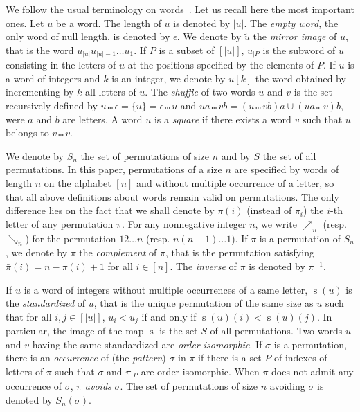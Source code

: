 \documentclass[a4paper]{llncs}
\DeclareMathOperator{\STD}{\mathrm{s}}
\begin{document}
We follow the usual terminology on words~\cite{ChoffrutKarhumaki1997}.
Let us recall here the most important ones. Let $u$ be a word. The
length of $u$ is denoted by $|u|$. The {\em empty word}, the only word
of null length, is denoted by $\epsilon$. We denote by $\widetilde{u}$
the {\em mirror image} of $u$, that is the word
$u_{|u|} u_{|u| - 1} \dots u_1$. If $P$ is a subset of $[|u|]$, $u_{|P}$
is the subword of $u$ consisting in the letters of $u$ at the positions
specified by the elements of $P$. If $u$ is a word of integers and $k$
is an integer, we denote by $u[k]$ the word obtained by incrementing by
$k$ all letters of $u$. The {\em shuffle} of two words $u$ and $v$ is
the set recursively defined by
$u \shuffle \epsilon = \{u\} = \epsilon \shuffle u$ and
$ua \shuffle vb = (u \shuffle vb)a \cup (ua \shuffle v)b$, were $a$ and
$b$ are letters. A word $u$ is a {\em square} if there exists a word $v$
such that $u$ belongs to $v \shuffle v$.

We denote by $S_n$ the set of permutations of size $n$ and by $S$ the
set of all permutations. In this paper, permutations of a size $n$ are
specified by words of length $n$ on the alphabet $[n]$ and without
multiple occurrence of a letter, so that all above definitions about
words remain valid on permutations. The only difference lies on the
fact that we shall denote by $\pi(i)$ (instead of $\pi_i$) the $i$-th
letter of any permutation $\pi$. For any nonnegative integer $n$, we
write $\nearrow_{n}$ (resp. $\searrow_{n}$) for the permutation
$1 2 \dots n$ (resp. $n (n-1) \dots 1$). If $\pi$ is a permutation of
$S_n$, we denote by $\bar \pi$ the {\em complement} of $\pi$, that is
the permutation satisfying $\bar \pi(i) = n - \pi(i) + 1$ for all
$i \in [n]$. The {\em inverse} of $\pi$ is denoted by $\pi^{-1}$.

If $u$ is a word of integers without multiple occurrences of a same
letter, $\STD(u)$ is the {\em standardized} of $u$, that is the unique
permutation of the same size as $u$ such that for all $i, j \in [|u|]$,
$u_i < u_j$ if and only if $\STD(u)(i) < \STD(u)(j)$. In particular, the
image of the map $\STD$ is the set $S$ of all permutations. Two words $u$
and $v$ having the same standardized are {\em order-isomorphic}. If
$\sigma$ is a permutation, there is an {\em occurrence} of (the
{\em pattern}) $\sigma$ in $\pi$ if there is a set $P$ of indexes of
letters of $\pi$ such that $\sigma$ and $\pi_{|P}$ are order-isomorphic.
When $\pi$ does not admit any occurrence of $\sigma$, $\pi$ {\em avoids}
$\sigma$. The set of permutations of size $n$ avoiding $\sigma$ is 
denoted by $S_n(\sigma)$.
\end{document}

